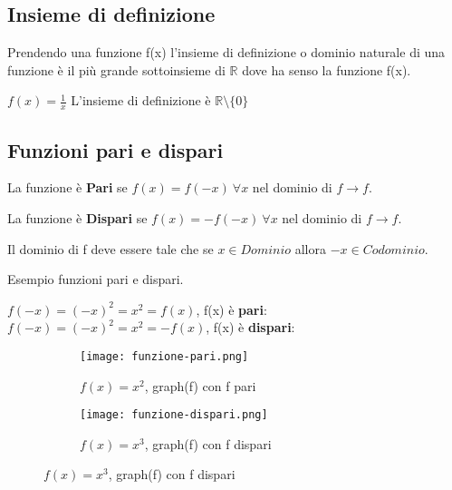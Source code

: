 \subsection{Insieme di definizione}
\begin{definition}
    Prendendo una funzione f(x) l'insieme di definizione o dominio naturale di una funzione è il più grande sottoinsieme di $\mathbb{R}$ dove ha senso la funzione f(x).
\end{definition}
\begin{example}
    $f(x) = \frac{1}{x}$ \hspace{.3cm} L'insieme di definizione è $\mathbb{R} \setminus \{0\}$
\end{example}

\subsection{Funzioni pari e dispari}
\begin{definition}[Pari]
    La funzione è \textbf{Pari} se $f(x) = f(-x) \: \forall x$ nel dominio di $f \longrightarrow f$.
\end{definition}
\begin{definition}[Dispari]
    La funzione è \textbf{Dispari} se $f(x) = -f(-x) \: \forall x$ nel dominio di $f \longrightarrow f$.
\end{definition}
\begin{note}
    Il dominio di f deve essere tale che se $x \in Dominio$ allora $-x \in Codominio$.\\
\end{note}
\begin{example}
Esempio funzioni pari e dispari.\\
\end{example}
$f(-x) = (-x)^2 = x^2 = f(x)$, f(x) è \textbf{pari}: \hfill $f(-x) = (-x)^2 = x^2 = -f(x)$, f(x) è \textbf{dispari}:
\begin{figure}[h!]
    \vspace{-1pt}
    \begin{subfigure}{.5\textwidth}
        \centering
        \texttt{[image: funzione-pari.png]}
        \caption{$f(x) = x^2$, \hspace{.2cm} graph(f) con f pari}
    \end{subfigure}
    \begin{subfigure}{.5\textwidth}
        \centering
        \texttt{[image: funzione-dispari.png]}
        \caption{$f(x) = x^3$, \hspace{.2cm} graph(f) con f dispari}
    \end{subfigure}
\end{figure}

